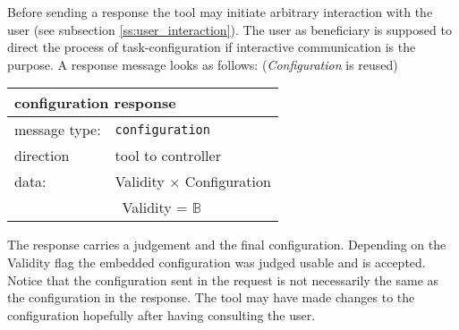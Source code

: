 \documentclass{article}
\newcommand{\msg}[1]{\texttt{#1}}
\begin{document}
   Before sending a response the tool may initiate arbitrary interaction with
   the user (see subsection \ref{ss:user_interaction}). The user as beneficiary
   is supposed to direct the process of task-configuration if interactive
   communication is the purpose. A response message looks as follows:
   (\textit{Configuration} is reused)

   \begin{table}[H]
    \begin{center}
     \begin{tabular}{|ll|}
      \hline
       \multicolumn{2}{|l|}{\textbf{configuration response}} \\
      \hline
       message type:   & \msg{configuration} \\
      \hline
       direction       & tool to controller \\
       data:           & Validity $\times$ Configuration \\
                       & \ Validity = $\mathbb{B}$ \\
      \hline
     \end{tabular}
    \end{center}
    \vspace{-0.4cm}
   \end{table}

   \noindent The response carries a judgement and the final configuration.
   Depending on the Validity flag the embedded configuration was judged usable
   and is accepted. Notice that the configuration sent in the request is not
   necessarily the same as the configuration in the response. The tool may have
   made changes to the configuration hopefully after having consulting the
   user.


\end{document}
